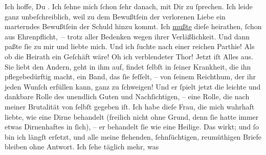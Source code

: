 \pstart
           Ich hoffe, Du \label{K_L03362-2v}\label{K_L03362-2}. Ich{ }ſehne mich{ }ſchon{ }ſehr danach, mit Dir zu{ }ſprechen. Ich leide {\pb}ganz unbeſchreiblich, weil zu dem Bewußtſein der
               verlorenen Liebe ein marterndes Bewußtſein der Schuld hinzu kommt. Ich \uline{mußte} dieſe \label{K_L03362-3v}\label{K_L03362-3} heirathen,{ }ſchon aus Ehrenpflicht, – trotz aller Bedenken wegen ihrer
               Verläßlichkeit. Und dann paßte{ }ſie zu mir und liebte mich. Und ich{ }ſuchte nach einer
               reichen Parthie! Als ob die Heirath ein Geſchäft wäre! Oh ich verblendeter Thor!
               Jetzt iſt {\pb}Alles aus. Sie liebt den Andern, geht in ihm auf, findet{ }ſelbſt in{ }ſeiner Krankheit, die ihn pflegebedürftig macht, ein \strikeout{\textcolor{gray}{w}} Band, das{ }ſie feſſelt, – von{ }ſeinem Reichthum, der ihr jeden Wunſch erfüllen
               kann, ganz zu{ }ſchweigen! Und er{ }ſpielt  jetzt die
               leichte und dankbare Rolle des unendlich Guten und Nachſichtigen, – eine Rolle, die
               nach meiner Brutalität von{ }ſelbſt gegeben iſt. Ich habe dieſe Frau, die mich wahrhaft liebte, wie eine
                  {\pb}Dirne behandelt (freilich nicht ohne Grund, denn{ }ſie hatte immer etwas Dirnenhaftes in{ }ſich), – er behandelt{ }ſie wie eine
               Heilige. Das wirkt; und{ }ſo bin ich längſt erſetzt, und alle meine flehenden,{ }ſehnſüchtigen, reumüthigen Briefe bleiben ohne Antwort. Ich{ }ſehe täglich mehr, was
